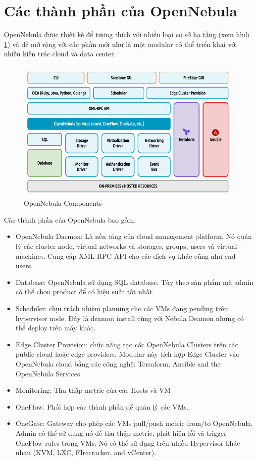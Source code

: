 \section{Các thành phần của OpenNebula}
OpenNebula được thiết kế để tương thích với nhiều loại cơ sở hạ tầng (xem hình \ref{fig:chap1-nebula-components}) và dễ mở rộng với các phần mới như là một modular có thể triển khai với nhiều kiến trúc cloud và data center.
\begin{figure}
    \centering
    \includegraphics*[scale=0.4]{graphics/main/overivew/chap1-nebula-components.png}
    \caption{OpenNebula Components}
    \label{fig:chap1-nebula-components}
\end{figure}
Các thành phần của OpenNebula bao gồm:
\begin{itemize}
    \item OpenNebula Daemon: Là nền tảng của cloud management platform. Nó quản lý các cluster node, virtual networks và storages, groups, users và virtual machines. Cung cấp XML-RPC API cho các dịch vụ khác cũng như end-users.
    \item Database: OpenNebula sử dụng SQL database. Tùy theo sản phẩm mà admin có thể chọn product để có hiệu suất tốt nhất.
    \item Scheduler: chịu trách nhiệm planning cho các VMs đang pending trên hypervisor node. Đây là deamon install cùng với Nebula Deamon nhưng có thể deploy trên máy khác.
    \item Edge Cluster Provision: chức năng tạo các OpenNebula Clusters trên các public cloud hoặc edge providers. Modular này tích hợp Edge Cluster vào OpenNebula cloud bằng các công nghệ: Terraform, Ansible and the OpenNebula Services
    \item Monitoring: Thu thập metric của các Hosts và VM
    \item OneFlow: Phối hợp các thành phần để quản lý các VMs.
    \item OneGate: Gateway cho phép các VMs pull/push metric from/to OpenNebula. Admin có thể sử dụng nó để thu thập metric, phát hiện lỗi và trigger OneFlow rules trong VMs. Nó có thể sử dụng trên nhiều Hypervisor khác nhau (KVM, LXC, FIrecracker, and vCenter).
\end{itemize}

